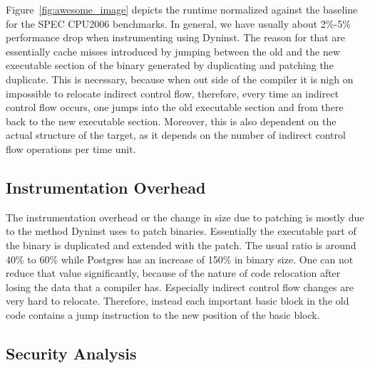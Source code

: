 Figure~\ref{fig:awesome_image} depicts the runtime normalized against the baseline for
the SPEC CPU2006 benchmarks. In general, we have usually about 2\%-5\% performance drop when instrumenting using Dyninst. 
The reason for that are essentially cache misses introduced by jumping between the old and the new executable section of the binary 
generated by duplicating and patching the duplicate. This is necessary, because when out side of the compiler it is nigh on impossible to 
relocate indirect control flow, therefore, every time an indirect control flow occurs, one jumps into the old executable section and 
from there back to the new executable section. 
Moreover, this is also dependent on the actual structure of the target, as it depends on the number of indirect control flow operations per time unit.


\subsection{Instrumentation Overhead}
\label{section:typeshieldoverheadinstrumentation}


The instrumentation overhead or the change in size due to patching is mostly due to the method Dyninst uses to patch binaries. 
Essentially the executable part of the binary is duplicated and extended with the patch. The usual ratio is around 40\% to 
60\% while Postgres has an increase of 150\% in binary size. One can not reduce that value significantly, 
because of the nature of code relocation after losing the data that a compiler has. Especially indirect control flow 
changes are very hard to relocate. Therefore, instead each important basic block in the old code contains a jump 
instruction to the new position of the basic block.

\subsection{Security Analysis}
\label{RQ5: Security Analysis}

